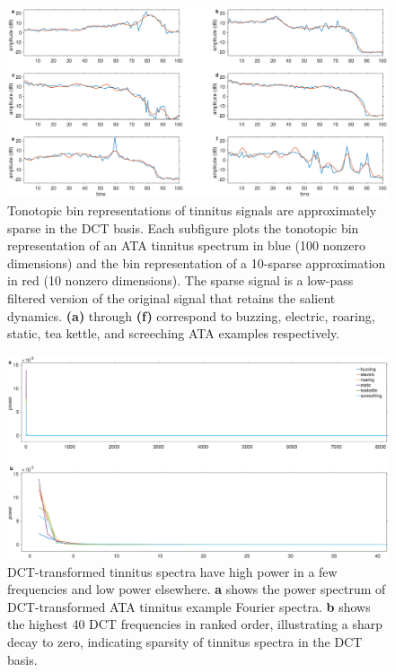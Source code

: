 \documentclass[journal]{IEEEtran}
\begin{document}
\begin{figure}[h]
	\centering
	\includegraphics[width=\linewidth]{gfx/target_signal_sparsity_2.eps}
	\caption{Tonotopic bin representations of tinnitus signals are approximately sparse
    in the DCT basis.
    Each subfigure plots the tonotopic bin representation of an ATA tinnitus spectrum
    in blue (100 nonzero dimensions) and the bin representation of a 10-sparse
    approximation in red (10 nonzero dimensions).
    The sparse signal is a low-pass filtered version of the original signal
    that retains the salient dynamics.
    \textbf{(a)} through \textbf{(f)} correspond to
    buzzing, electric, roaring, static, tea kettle, and screeching ATA examples
    respectively.}
	\label{fig:target_signal_sparsity_2}
\end{figure}

\begin{figure}[h]
	\centering
	\includegraphics[width=\linewidth]{gfx/target_signal_sparsity_3.eps}
	\caption{DCT-transformed tinnitus spectra have high power in a few frequencies
  and low power elsewhere. \textbf{a} shows the power spectrum of DCT-transformed
  ATA tinnitus example Fourier spectra. \textbf{b} shows the highest 40 DCT frequencies
  in ranked order, illustrating a sharp decay to zero, indicating sparsity
  of tinnitus spectra in the DCT basis.}
	\label{fig:target_signal_sparsity_3}
\end{figure}





\end{document}
